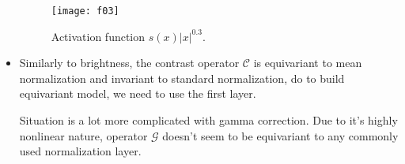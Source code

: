 \begin{itemize}
    \begin{figure}[h]
        \centering
        \texttt{[image: f03]}
        \caption{Activation function $s(x)|x|^{0.3}$.}
        \label{fig:f03}
    \end{figure}
\item Similarly to brightness, the contrast operator $\mathcal{C}$ is
    equivariant to mean normalization and invariant to standard normalization,
    do to build equivariant model, we need to use the first layer.

    Situation is a lot more complicated with gamma correction. Due to it's
    highly nonlinear nature, operator
    $\mathcal{G}$ doesn't seem to be equivariant to any
    commonly used normalization layer.
\end{itemize}







